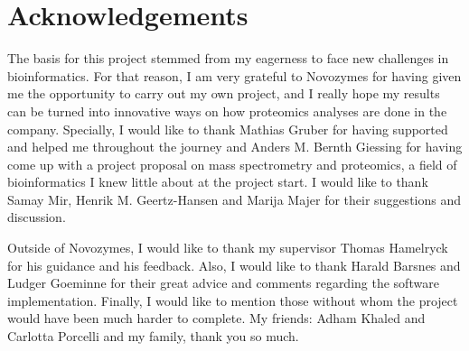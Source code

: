 \section*{Acknowledgements}

The basis for this project stemmed from my eagerness to face new challenges in bioinformatics. For that reason, I am very grateful to Novozymes for having given me the opportunity to carry out my own project, and I really hope my results can be turned into innovative ways on how proteomics analyses are done in the company. Specially, I would like to thank Mathias Gruber for having supported and helped me throughout the journey and Anders M. Bernth Giessing for having come up with a project proposal on mass spectrometry and proteomics, a field of bioinformatics I knew little about at the project start. I would like to thank Samay Mir, Henrik M. Geertz-Hansen and Marija Majer for their suggestions and discussion.

Outside of Novozymes, I would like to thank my supervisor Thomas Hamelryck for his guidance and his feedback. Also, I would like to thank Harald Barsnes and Ludger Goeminne for their great advice and comments regarding the software implementation. Finally, I would like to mention those without whom the project would have been much harder to complete. My friends: Adham Khaled and Carlotta Porcelli and my family, thank you so much.